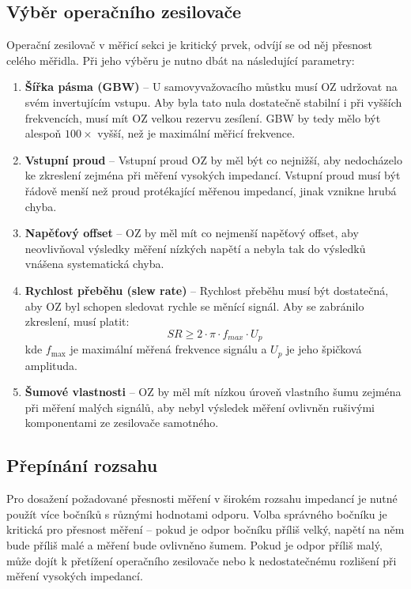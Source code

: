 \subsection{Výběr operačního zesilovače}
\label{sec:opamp_selection}
Operační zesilovač v měřicí sekci je kritický prvek, odvíjí se od něj přesnost celého měřidla.
Při jeho výběru je nutno dbát na následující parametry:
\begin{enumerate}
    \item \textbf{Šířka pásma (\acs{GBW})} -- U samovyvažovacího můstku musí \acs{OZ} udržovat  na svém invertujícím vstupu. 
    Aby byla tato nula dostatečně stabilní i při vyšších frekvencích, musí mít \acs{OZ} velkou rezervu zesílení. 
    \acs{GBW} by tedy mělo být alespoň $100\times$ vyšší, než je maximální měřicí frekvence. 
    \item \textbf{Vstupní proud} -- Vstupní proud \acs{OZ} by měl být co nejnižší, aby nedocházelo ke zkreslení zejména při měření vysokých impedancí. \cite{TI_ImpedanceMeasurement} 
    Vstupní proud musí být řádově menší než proud protékající měřenou impedancí, jinak vznikne hrubá chyba.
    \item \textbf{Napěťový offset} -- \acs{OZ} by měl mít co nejmenší napěťový offset, aby neovlivňoval výsledky měření nízkých napětí a nebyla tak do výsledků vnášena systematická chyba.
    \item \textbf{Rychlost přeběhu (slew rate)} -- Rychlost přeběhu musí být dostatečná, aby \acs{OZ} byl schopen sledovat rychle se měnící signál. Aby se zabránilo zkreslení, musí platit:
    \begin{equation}
        SR \geq 2 \cdot \pi \cdot f_{max} \cdot U_p
    \end{equation}
    kde $f_{\text{max}}$ je maximální měřená frekvence signálu a $U_p$ je jeho špičková amplituda. \cite[str.~248]{ArtOfElectronics}
    \item \textbf{Šumové vlastnosti} -- \acs{OZ} by měl mít nízkou úroveň vlastního šumu zejména při měření malých signálů, aby nebyl výsledek měření ovlivněn rušivými komponentami ze zesilovače samotného.
\end{enumerate}


\subsection{Přepínání rozsahu}

Pro dosažení požadované přesnosti měření v širokém rozsahu impedancí je nutné použít více bočníků s různými hodnotami odporu. 
Volba správného bočníku je kritická pro přesnost měření -- pokud je odpor bočníku příliš velký, napětí na něm bude příliš malé a měření bude ovlivněno šumem.
Pokud je odpor příliš malý, může dojít k přetížení operačního zesilovače nebo k nedostatečnému rozlišení při měření vysokých impedancí.

